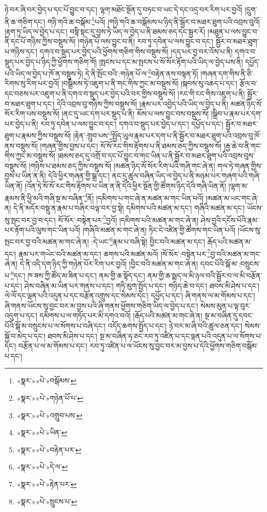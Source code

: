 ཉེ་བར་ཞི་བར་བྱེད་པ་དང་པོ་བྱུང་བ་དང་། ལྷག་མཐོང་སྔོན་དུ་བཏང་བ་ཡང་དེ་དང་འདྲ་བར་རིག་པར་བྱའོ། །དྲུག་ནི་ཆ་གཅིག་དང་། གཉི་གའི་ཆ་བསྒོམ་\footnote{«སྣར་»«པེ་»བསྒོམས་}པའོ། །གཉི་གའི་ཆ་བསྒོམས་པ་ཉིད་ནི་སྦྱོར་བ་མཐར་ཐུག་པའི་འབྲས་བུའོ། །རྟག་ཏུ་ཡིད་ལ་བྱེད་པ་དང་། བསྟི་སྟང་དུ་བྱས་ཏེ་ཡིད་ལ་བྱེད་པ་ནི་ཐམས་ཅད་དང་སྦྱར་རོ། །མཐུན་པ་ལས་བྱུང་བ་ནི་དང་པོ་གཉིས་ཀྱིས་བསྡུས་སོ། །གཉེན་པོ་ལས་བྱུང་བ་ནི། རབ་ཏུ་དབེན་པ་ལས་བྱུང་བ་དང་། སྦྱོར་བ་མཐར་ཐུག་པ་གཉིས་དང་། དགའ་བ་སྡུད་པར་བྱེད་པའི་ཕྱོགས་གཅིག་གིས་བསྡུས་སོ། །དད་པར་བྱ་བར་འོས་པ་ནི། དགའ་བ་སྡུད་པར་བྱེད་པ་ཉིད་ཀྱི་ཕྱོགས་གཅིག་གོ། །སྤངས་པ་དང་མ་སྤངས་པ་སོ་སོར་རྟོག་པའི་ཡིད་ལ་བྱེད་པས་ནི། དཔྱོད་པའི་ཡིད་ལ་བྱེད་པ་ཁོ་ན་བསྡུས་ཏེ། དེ་ནི་སྤོང་བའི་:གཉེན་པོ་ལ་\footnote{«སྣར་»«པེ་»གཉེན་པོ་པ་}བརྟེན་ནས་བསྟན་ཏོ། །གཞན་དག་གིས་ནི་ཅི་རིགས་སུ་རིག་པར་བྱའོ། །བསྒྲིམས་ཏེ་འཇུག་པ་ནི་གང་གིས་ཀྱང་མ་བསྡུས་སོ། །སྐབས་སུ་འཆད་པ་དང་། རྩོལ་བ་དང་བཅས་པར་འཇུག་པ་ནི་དགའ་བ་སྡུད་པར་བྱེད་པའི་བར་གྱིས་བསྡུས་སོ། །རང་གི་ངང་གིས་འཇུག་པ་ནི། སྦྱོར་བ་མཐར་ཐུག་པ་དང་། དེའི་འབྲས་བུ་གཉིས་ཀྱིས་བསྡུས་སོ། །རྣམ་པར་འབྱེད་པའི་ཡིད་ལ་བྱེད་པ་ནི། མཚན་ཉིད་སོ་སོར་རིག་པས་བསྡུས་སོ། །ནང་དུ་ཡང་དག་པར་སྡུད་པ་ནི། མོས་པ་ལས་བྱུང་བས་བསྡུས་སོ། །སྒྲིབ་པ་རྣམ་པར་དག་པར་བྱེད་པ་ནི། རབ་ཏུ་དབེན་པ་ལས་བྱུང་བ་དང་། དགའ་བ་སྡུད་པར་བྱེད་པ་དང་། དཔྱོད་པ་དང་། སྦྱོར་བ་མཐར་ཐུག་པ་རྣམས་ཀྱིས་བསྡུས་སོ། །རྟེན་:གྲུབ་པས་\footnote{«སྣར་»«པེ་»འགྲུབ་པས་}སྤྱོད་ཡུལ་རྣམ་པར་དག་པ་ནི་སྦྱོར་བ་མཐར་ཐུག་པའི་འབྲས་བུ་ཁོ་ནས་བསྡུས་སོ། །གཞན་གྱིས་བྱས་པ་དང་། སོ་སོ་རང་གིས་རྟོགས་པ་ནི་ཐམས་ཅད་ཀྱིས་བསྡུས་སོ། །རྒྱ་ཆེ་བ་ནི་གང་གིས་ཀྱང་མ་བསྡུས་སོ། །ཐམས་ཅད་དུ་འགྲོ་བ་དང་པོ་བྱུང་བ་གང་ཡིན་པ་ནི་སྦྱོར་བ་མཐར་ཐུག་པའི་འབྲས་བུས་བསྡུས་སོ། །གཉིས་པ་ཐམས་ཅད་ཀྱིས་བསྡུས་སོ། །མཚན་ཉིད་སོ་སོར་རིག་པའི་གཞི་གང་ཞེ་ན། གལ་ཏེ་གཞན་གྱིས་བྱས་པ་ཡིན་ན་ནི། དེའི་ཕྱིར་གཞན་གྱི་སྒྲ་དང་། ནང་དུ་ཚུལ་བཞིན་ཡིད་ལ་བྱེད་པ་ནི་མཉམ་པར་གཞག་པའི་གཞི་ཡིན་ནོ། །འོན་ཏེ་སོ་སོ་རང་གིས་རྟོགས་པ་ཡིན་ན་ནི་དེའི་ཕྱིར་སྔོན་གྱི་ཚོགས་ཉིད་དེའི་གཞི་ཡིན་ནོ། །ལྷག་མ་རྣམས་ནི་ཕྱི་མའི་གཞི་སྔ་མ་བཞིན་\footnote{«སྣར་»«པེ་»ཡིན་}ནོ། །དམིགས་པ་གང་ཞེ་ན་མཚན་མ་གང་ཡིན་པའོ། །མཚན་མ་ཡང་གང་ཞེ་ན། དེ་ནི་མདོར་བསྡུ་ན་རྣམ་པ་བཞིར་བལྟ་བར་བྱ་སྟེ། དམིགས་པའི་མཚན་མ་དང་། གཞིའི་མཚན་མ་དང་། ཡོངས་སུ་སྤང་བར་བྱ་བ་དང་། སོ་སོར་:བསྟེན་པར་\footnote{«སྣར་»«པེ་»བརྟེན་པར་}བྱའོ། །དམིགས་པའི་མཚན་མ་གང་ཞེ་ན། ཤེས་བྱའི་དངོས་པོའི་རྣམ་པར་རྟོག་པའི་ལུས་གང་ཡིན་པའོ། །གཞིའི་མཚན་མ་གང་ཞེ་ན། ཏིང་ངེ་འཛིན་གྱི་ཚོགས་གང་ཡིན་པའོ། །ཡོངས་སུ་སྤང་བར་བྱ་བའི་མཚན་མ་གང་ཞེ་ན། :དེ་ཡང་\footnote{«སྣར་»«པེ་»དེ་ལ་}རྣམ་པ་བཞི་སྟེ། བྱིང་བའི་མཚན་མ་དང་། རྒོད་པའི་མཚན་མ་དང་། རྣམ་པར་གཡེང་བའི་མཚན་མ་དང་། ཆགས་པའི་མཚན་མའོ། །སོ་སོར་:བསྟེན་པར་\footnote{«སྣར་»«པེ་»རྟེན་པར་}བྱ་བའི་མཚན་མ་གང་ཞེ་ན། དེ་ནི་འདི་དག་ཉིད་ཀྱི་གཉེན་པོར་རིག་པར་བྱའོ། །བྱིང་བའི་མཚན་མ་གང་ཞེ་ན། དབང་པོའི་སྒོ་མ་:བསྲུངས་པ་\footnote{«སྣར་»«པེ་»སྲུངས་པ་}དང་། ཁ་ཟས་ཀྱི་ཚོད་མ་ཟིན་པ་དང་། ནམ་གྱི་ཆ་སྟོད་དང་། ནམ་གྱི་ཆ་སྨད་ལ་མི་ཉལ་བའི་སྦྱོར་བ་ལ་མི་བརྩོན་པ་དང་། ཤེས་བཞིན་མ་ཡིན་པར་གནས་པ་དང་། གཏི་མུག་སྤྱོད་པ་དང་། གཉིད་ཆེ་བ་དང་། ཐབས་མི་ཤེས་པ་དང་། ལེ་ལོ་དང་ལྡན་པའི་འདུན་པ་དང་བརྩོན་འགྲུས་དང་སེམས་དང་། དཔྱོད་པ་དང་། ཞི་གནས་ལ་མ་གོམས་པ་དང་། ཞི་གནས་ཡོངས་སུ་བྱང་བར་མ་བྱས་པའི་ཞི་གནས་ཕྱོགས་གཅིག་ཡིད་ལ་བྱེད་པ་དང་། སེམས་མུན་པ་ལྟ་བུར་འདུག་པ་དང་། དམིགས་པ་ལ་གཏོད་པར་མི་དགའ་བའོ། །རྒོད་པའི་མཚན་མ་གང་ཞེ་ན། སྔ་མ་བཞིན་དུ་དབང་པོའི་སྒོ་མ་བསྲུངས་པ་ལ་སོགས་པ་བཞི་དང་། འདོད་ཆགས་སྤྱོད་པ་དང་། ཉེ་བར་མ་ཞི་བའི་ཚུལ་ཅན་དང་། སེམས་སྐྱོ་བ་མེད་པ་དང་། ཐབས་མི་ཤེས་པ་དང་། སྔ་མ་བཞིན་ཧ་ཅང་རབ་ཏུ་འཛིན་པ་དང་ལྡན་པའི་འདུན་པ་ལ་སོགས་པ་དང་། བརྩོན་པ་ལ་མ་གོམས་པ་དང་། རབ་ཏུ་འཛིན་པ་ལ་ཡོངས་སུ་བྱང་བར་མ་བྱས་པ་དེའི་ཕྱོགས་གཅིག་བསྒོམ་པ་དང་། 